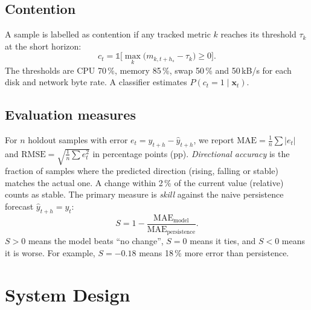 \documentclass[conference]{IEEEtran}
\begin{document}
\subsection{Contention}
A sample is labelled as contention if any tracked metric $k$ reaches its
threshold $\tau_k$ at the short horizon:
\begin{equation}
  c_t = \mathbb{1}\Big[\max_k \big(m_{k,t+h_s} - \tau_k\big) \ge 0\Big].
\end{equation}
The thresholds are CPU 70\,\%, memory 85\,\%, swap 50\,\% and 50\,kB/s for
each disk and network byte rate. A classifier estimates $P(c_t=1\mid\mathbf{x}_t)$.

\subsection{Evaluation measures}
For $n$ holdout samples with error $e_t=y_{t+h}-\hat y_{t+h}$, we report
$\mathrm{MAE}=\frac1n\sum|e_t|$ and $\mathrm{RMSE}=\sqrt{\frac1n\sum e_t^2}$
in percentage points (pp). \emph{Directional accuracy} is the fraction of
samples where the predicted direction (rising, falling or stable) matches the
actual one. A change within 2\,\% of the current value (relative) counts as
stable. The primary measure is \emph{skill} against the naive persistence
forecast $\hat y_{t+h}=y_t$:
\begin{equation}
  S = 1 - \frac{\mathrm{MAE}_{\text{model}}}{\mathrm{MAE}_{\text{persistence}}}.
  \label{eq:skill}
\end{equation}
$S>0$ means the model beats ``no change'', $S=0$ means it ties, and $S<0$
means it is worse. For example, $S=-0.18$ means 18\,\% more error than
persistence.

\section{System Design}\label{sec:system}
\end{document}
